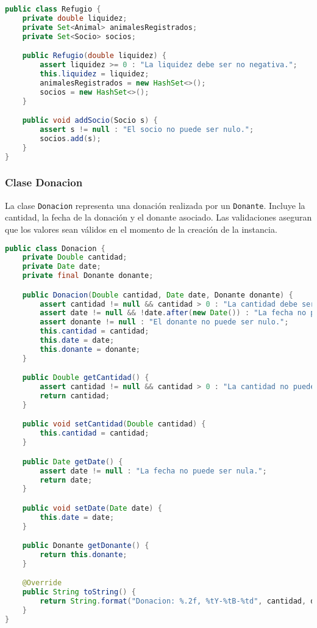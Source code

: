 \begin{lstlisting}[language=Java]
public class Refugio {
    private double liquidez;
    private Set<Animal> animalesRegistrados;
    private Set<Socio> socios;

    public Refugio(double liquidez) {
        assert liquidez >= 0 : "La liquidez debe ser no negativa.";
        this.liquidez = liquidez;
        animalesRegistrados = new HashSet<>();
        socios = new HashSet<>();
    }

    public void addSocio(Socio s) {
        assert s != null : "El socio no puede ser nulo.";
        socios.add(s);
    }
}
\end{lstlisting}

\subsubsection{Clase Donacion}
La clase \texttt{Donacion} representa una donación realizada por un \texttt{Donante}. Incluye la cantidad, la fecha de la donación y el donante asociado. Las validaciones aseguran que los valores sean válidos en el momento de la creación de la instancia.

\begin{lstlisting}[language=Java]
public class Donacion {
    private Double cantidad;
    private Date date;
    private final Donante donante;

    public Donacion(Double cantidad, Date date, Donante donante) {
        assert cantidad != null && cantidad > 0 : "La cantidad debe ser positiva.";
        assert date != null && !date.after(new Date()) : "La fecha no puede ser nula ni estar en el futuro.";
        assert donante != null : "El donante no puede ser nulo.";
        this.cantidad = cantidad;
        this.date = date;
        this.donante = donante;
    }

    public Double getCantidad() {
        assert cantidad != null && cantidad > 0 : "La cantidad no puede ser nula.";
        return cantidad;
    }

    public void setCantidad(Double cantidad) {
        this.cantidad = cantidad;
    }

    public Date getDate() {
        assert date != null : "La fecha no puede ser nula.";
        return date;
    }

    public void setDate(Date date) {
        this.date = date;
    }

    public Donante getDonante() {
        return this.donante;
    }

    @Override
    public String toString() {
        return String.format("Donacion: %.2f, %tY-%tB-%td", cantidad, date, date, date);
    }
}
\end{lstlisting}


